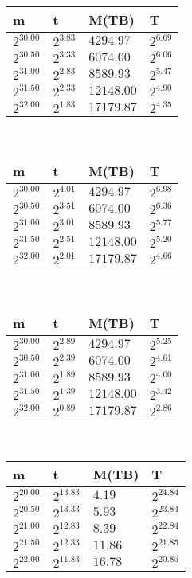  \ 
\begin{tabular}{llll}
m & t & M(TB) & T \\ \hline
$2^{30.00}$ & $2^{3.83}$ & $4294.97$ & $2^{6.69}$ \\
$2^{30.50}$ & $2^{3.33}$ & $6074.00$ & $2^{6.06}$ \\
$2^{31.00}$ & $2^{2.83}$ & $8589.93$ & $2^{5.47}$ \\
$2^{31.50}$ & $2^{2.33}$ & $12148.00$ & $2^{4.90}$ \\
$2^{32.00}$ & $2^{1.83}$ & $17179.87$ & $2^{4.35}$ \\
\end{tabular}
 \ 
\begin{tabular}{llll}
m & t & M(TB) & T \\ \hline
$2^{30.00}$ & $2^{4.01}$ & $4294.97$ & $2^{6.98}$ \\
$2^{30.50}$ & $2^{3.51}$ & $6074.00$ & $2^{6.36}$ \\
$2^{31.00}$ & $2^{3.01}$ & $8589.93$ & $2^{5.77}$ \\
$2^{31.50}$ & $2^{2.51}$ & $12148.00$ & $2^{5.20}$ \\
$2^{32.00}$ & $2^{2.01}$ & $17179.87$ & $2^{4.66}$ \\
\end{tabular}
 \ 
\begin{tabular}{llll}
m & t & M(TB) & T \\ \hline
$2^{30.00}$ & $2^{2.89}$ & $4294.97$ & $2^{5.25}$ \\
$2^{30.50}$ & $2^{2.39}$ & $6074.00$ & $2^{4.61}$ \\
$2^{31.00}$ & $2^{1.89}$ & $8589.93$ & $2^{4.00}$ \\
$2^{31.50}$ & $2^{1.39}$ & $12148.00$ & $2^{3.42}$ \\
$2^{32.00}$ & $2^{0.89}$ & $17179.87$ & $2^{2.86}$ \\
\end{tabular}
 \ 
\begin{tabular}{llll}
m & t & M(TB) & T \\ \hline
$2^{20.00}$ & $2^{13.83}$ & $4.19$ & $2^{24.84}$ \\
$2^{20.50}$ & $2^{13.33}$ & $5.93$ & $2^{23.84}$ \\
$2^{21.00}$ & $2^{12.83}$ & $8.39$ & $2^{22.84}$ \\
$2^{21.50}$ & $2^{12.33}$ & $11.86$ & $2^{21.85}$ \\
$2^{22.00}$ & $2^{11.83}$ & $16.78$ & $2^{20.85}$ \\
\end{tabular}
